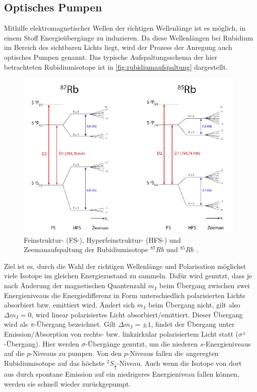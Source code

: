 \subsection{Optisches Pumpen}

Mithilfe elektromagnetischer Wellen der richtigen Wellenlänge ist es möglich, in einem Stoff Energieübergänge zu induzieren.
Da diese Wellenlängen bei Rubidium im Bereich des sichtbaren Lichts liegt, wird der Prozess der Anregung auch optisches Pumpen genannt.
Das typische Aufspaltungsschema der hier betrachteten Rubidiumisotope ist in \autoref{fig:rubidiumaufspaltung} dargestellt.
\begin{figure}[H]
    \centering
    \includegraphics{figures/AufspaltungRubidium.pdf}
    \caption{Feinstruktur- (FS-), Hyperfeinstruktur- (HFS-) und Zeemanaufspaltung der Rubidiumisotope $^{87}Rb$ und $^{85}Rb$ \cite{rubidiumspalt}.}
    \label{fig:rubidiumaufspaltung}
\end{figure}
Ziel ist es, durch die Wahl der richtigen Wellenlänge und Polarisation möglichst viele Isotope im gleichen Energiezustand zu sammeln.
Dafür wird genutzt, dass je nach Änderung der magnetischen Quantenzahl $m_\text{J}$ beim Übergang zwischen zwei Energieniveaus die Energiedifferenz in Form unterschiedlich polarisierten Lichts absorbiert bzw. emittiert wird.
Ändert sich $m_\text{J}$ beim Übergang nicht, gilt also $\Delta m_\text{J} = 0$, wird linear polarisiertes Licht absorbiert/emittiert.
Dieser Übergang wird als $\pi$-Übergang bezeichnet.
Gilt $\Delta m_\text{J} = \pm 1$, findet der Übergang unter Emission/Absorption von rechts- bzw. linkzirkular polarisiertem Licht statt ($\sigma^\pm$-Übergang).
Hier werden $\sigma$-Übergänge genutzt, um die niederen $s$-Energieniveaus auf die $p$-Niveaus zu pumpen.
Von den $p$-Niveaus fallen die angeregten Rubidiumisotope auf das höchste $^2S_\frac{1}{2}$-Niveau.
Auch wenn die Isotope von dort aus durch spontane Emission auf ein niedrigeres Energieniveau fallen können, werden sie schnell wieder zurückgepumpt.

